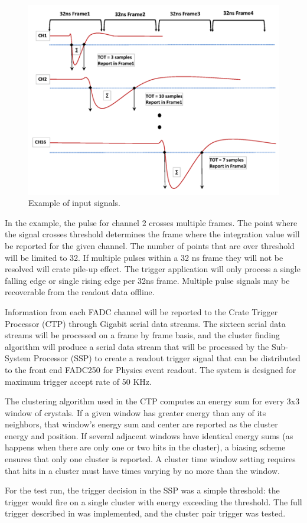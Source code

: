 \begin{figure}[t]
\includegraphics[scale=0.9]{test2012/trigger//trigger_pulse_samples}
\caption{\small{Example of input signals.}}\label{fig:trigsamples}
\end{figure}

In the example, the pulse for channel 2 crosses multiple frames.  The point where the signal crosses threshold determines the frame where the integration value will be reported for the given channel.  The number of points that are over threshold will be limited to 32. If multiple pulses within a 32 ns frame they will not be resolved will crate pile-up effect.  The trigger application will only process a single falling edge or single rising edge per 32ns frame.  Multiple pulse signals may be recoverable from the readout data offline.

Information from each FADC channel will be reported to the Crate Trigger Processor (CTP) through Gigabit serial data streams. The sixteen serial data streams will be processed on a frame by frame basis, and the cluster finding algorithm will produce a serial data stream that will be processed by the Sub-System Processor (SSP) to create a readout trigger signal that can be distributed to the front end FADC250 for Physics event readout. The system is designed for maximum trigger accept rate of 50 KHz. 

The clustering algorithm used in the CTP computes an energy sum for every 3x3 window of crystals. If a given window has greater energy than any of its neighbors, that window's energy sum and center are reported as the cluster energy and position. If several adjacent windows have identical energy sums (as happens when there are only one or two hits in the cluster), a biasing scheme ensures that only one cluster is reported. A cluster time window setting requires that hits in a cluster must have times varying by no more than the window.

For the test run, the trigger decision in the SSP was a simple threshold: the trigger would fire on a single cluster with energy exceeding the threshold. The full trigger described in \cite{HPS_tPROP} was implemented, and the cluster pair trigger was tested.
